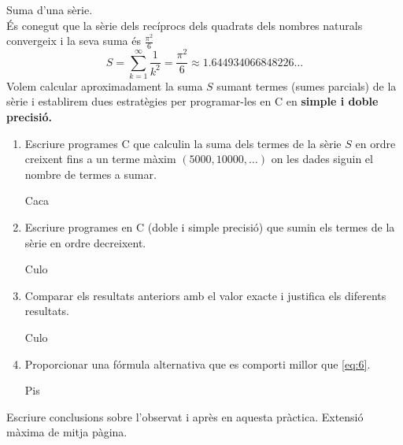 \documentclass[a4paper, 12pt]{article}
\begin{document}
    \begin{exercici}
        Suma d'una sèrie.\\
        És conegut que la sèrie dels recíprocs dels quadrats dels nombres naturals convergeix i la
        seva suma és $\frac{\pi^2}{6}$
        \begin{equation}
            S = \sum\limits_{k=1}^\infty\frac{1}{k^2} = \frac{\pi^2}{6} \approx 1.644934066848226\dots
            \label{eq:6}
        \end{equation}
        Volem calcular aproximadament la suma $S$ sumant termes (sumes parcials) de la sèrie i
        establirem dues estratègies per programar-les en C en \textbf{simple i doble precisió.}\\
        \begin{enumerate}[label=\alph*)]
            \item Escriure programes C que calculin la suma dels termes de la sèrie $S$ en ordre
            creixent fins a un terme màxim $\left(5000, 10000, \dots\right)$ on les dades siguin el
            nombre de termes a sumar.\\
            \begin{solucio}
                Caca
            \end{solucio}
            \item Escriure programes en C (doble i simple precisió) que sumin els termes de la sèrie
            en ordre decreixent.\\
            \begin{solucio}
                Culo
            \end{solucio}
            \item Comparar els resultats anteriors amb el valor exacte i justifica els diferents
            resultats.\\
            \begin{solucio}
                Culo
            \end{solucio}
            \item Proporcionar una fórmula alternativa que es comporti millor que \eqref{eq:6}.\\
            \begin{solucio}
                Pis
            \end{solucio}
        \end{enumerate}
    \end{exercici}
    \begin{exercici}
        Escriure conclusions sobre l'observat i après en aquesta pràctica. Extensió màxima de mitja
        pàgina. 
    \end{exercici}
\end{document}
